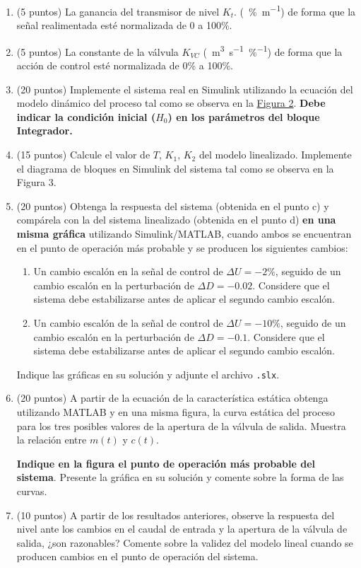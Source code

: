 \begin{enumerate}[label=\alph*), start=2]
    \item (5 puntos) La ganancia del transmisor de nivel $K_t$. (\SI{}{\%\metre\tothe{-1}}) de forma que la señal
realimentada esté normalizada de 0 a 100\%.


    \item (5 puntos) La constante de la válvula $K _{VC}$ (\SI{}{\metre\cubed\second\tothe{-1}\%\tothe{-1}}) de forma que la acción de control esté normalizada de 0\% a 100\%.


    \item (20 puntos) Implemente el sistema real en Simulink utilizando la ecuación del modelo
        dinámico del proceso tal como se observa en la \hyperref[fig2]{Figura 2}. \textbf{Debe indicar la condición inicial ($H_0$) en los parámetros del bloque Integrador.}

    \item (15 puntos) Calcule el valor de $T$, $K_1$, $K_2$ del modelo linealizado. Implemente el diagrama de bloques en Simulink del sistema tal como se observa en la Figura 3.

    \item (20 puntos) Obtenga la respuesta del sistema (obtenida en el punto c) y compárela con la del sistema linealizado (obtenida en el punto d) \textbf{en una misma gráfica} utilizando Simulink/MATLAB, cuando ambos se encuentran en el punto de operación más probable y se producen los siguientes cambios:
        \begin{enumerate}[label=\roman*.]
            \item Un cambio escalón en la señal de control de $\Delta U = -2\%$, seguido de un cambio escalón en la perturbación de $\Delta D = -0.02$.
                Considere que el sistema debe estabilizarse antes de aplicar el segundo cambio escalón.
            \item Un cambio escalón de la señal de control de $\Delta U = -10\%$, seguido de un cambio escalón en la perturbación de $\Delta D = -0.1$. Considere que el sistema debe estabilizarse antes de aplicar el segundo cambio escalón.
        \end{enumerate}
        Indique las gráficas en su solución y adjunte el archivo \texttt{.slx}.

        
    \item (20 puntos) A partir de la ecuación de la característica estática obtenga utilizando MATLAB
y en una misma figura, la curva estática del proceso para los tres posibles valores de la
apertura de la válvula de salida. Muestra la relación entre $m(t)$ y $c(t)$. 

\textbf{Indique en la figura el punto de operación más probable del sistema}. Presente la gráfica en su solución y comente sobre la forma de las curvas.
    \item (10 puntos) A partir de los resultados anteriores, observe la respuesta del nivel ante los
cambios en el caudal de entrada y la apertura de la válvula de salida, ¿son razonables?
Comente sobre la validez del modelo lineal cuando se producen cambios en el punto
de operación del sistema.

\end{enumerate}

